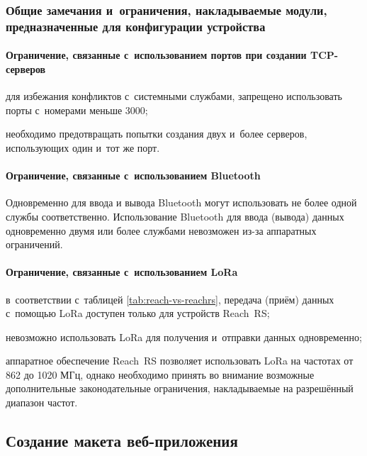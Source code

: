 \subsubsection{Общие замечания и~ограничения, накладываемые модули, предназначенные для конфигурации устройства}

\paragraph{Ограничение, связанные с~использованием портов при создании TCP-серверов}

\begin{dashitemize}
  \item для избежания конфликтов с~системными службами, запрещено использовать порты с~номерами меньше 3000;
  \item необходимо предотвращать попытки создания двух и~более серверов, использующих один и~тот же порт.
\end{dashitemize}

\paragraph{Ограничение, связанные с~использованием Bluetooth}

Одновременно для ввода и вывода Bluetooth могут использовать не более одной службы соответственно. Использование Bluetooth для ввода (вывода) данных одновременно двумя или более службами невозможен из-за аппаратных ограничений.

\paragraph{Ограничение, связанные с~использованием LoRa}

\begin{dashitemize}
  \item в~соответствии с~таблицей \ref{tab:reach-vs-reachrs}, передача (приём) данных с~помощью LoRa доступен только для устройств Reach~RS;
  \item невозможно использовать LoRa для получения и~отправки данных одновременно;
  \item аппаратное обеспечение Reach~RS позволяет использовать LoRa на частотах от 862 до 1020 МГц, однако необходимо принять во внимание возможные дополнительные законодательные ограничения, накладываемые на разрешённый диапазон частот.
\end{dashitemize}


\subsection{Создание макета веб-приложения}
\label{subsec:app-sketch}

